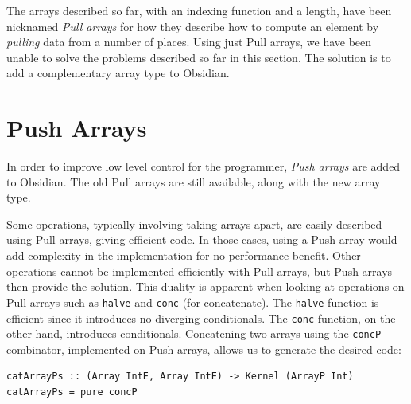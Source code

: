 \documentclass[]{sigplanconf}
\begin{document}
  
The arrays described so far, with an indexing function and a length, have 
been nicknamed {\em Pull arrays} for how they describe how to 
compute an element by {\em pulling} data from a number 
of places. Using just Pull arrays, we have been unable to solve the 
problems described so far in this section. The solution is to add a complementary array type to Obsidian. 











% 
\section{Push Arrays}

In order to improve low level control for the programmer, {\em Push
arrays} are added to Obsidian. The old Pull arrays are still available,
along with the new array type. 

Some operations, typically involving taking arrays apart,
are easily described using Pull arrays, giving
efficient code. In those cases, using a Push array would add complexity in the 
implementation for no performance benefit.
Other operations cannot be implemented efficiently
with Pull arrays, but Push arrays then provide the solution.
This duality is apparent when looking at operations on Pull arrays such as
{\tt halve} and {\tt conc} (for concatenate). 
The {\tt halve} function is efficient since it introduces no diverging 
conditionals. The {\tt conc} function, on the other hand, introduces conditionals.
Concatening two arrays using the {\tt concP} combinator, implemented on Push arrays, 
allows us to generate the desired code:

\begin{codesize}
\begin{verbatim}
catArrayPs :: (Array IntE, Array IntE) -> Kernel (ArrayP Int)
catArrayPs = pure concP
\end{verbatim}
\end{codesize} 
\end{document}

